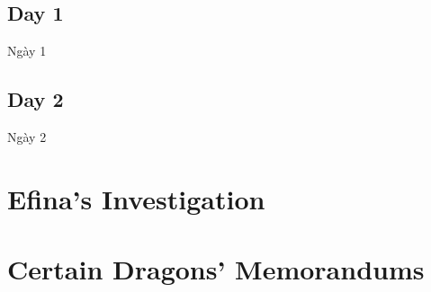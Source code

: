 \documentclass[13pt]{extarticle}
\begin{document}
	
	\subsection*{Day 1}
	Ngày 1 
	
	\subsection*{Day 2}
	Ngày 2 
	
	\section{Efina’s Investigation}
	
	\section{Certain Dragons’ Memorandums}
	
	
\end{document}
